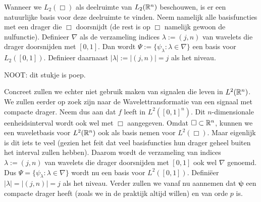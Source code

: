 Wanneer we $L_2(\Box)$ als deelruimte van $L_2(\mathbb{R}^n)$ beschouwen, is er een natuurlijke basis voor deze deelruimte te vinden. Neem namelijk alle basisfuncties met een drager die $\Box$ doorsnijdt (de rest is op $\Box$ namelijk gewoon de nulfunctie). Definieer $\nabla$ als de verzameling indices $\lambda := (j, n)$ van wavelets die drager doorsnijden met $[0,1]$. Dan wordt $\Psi := \{ \psi_\lambda: \lambda \in \nabla \}$ een basis voor $L_2([0,1])$. Definieer daarnaast $|\lambda| := |(j,n)| = j$ als het niveau.

NOOT: dit stukje is poep.


Concreet zullen we echter niet gebruik maken van signalen die leven in $L^2(\mathbb{R}^n)$. We zullen eerder op zoek zijn naar de Wavelettransformatie van een signaal met compacte drager. Neem dus aan dat $f$ leeft in $L^2([0,1]^n)$. Dit $n$-dimensionale eenheidsinterval wordt ook wel met $\Box$ aangegeven. Omdat $\Box \subset \mathbb{R}^n$, kunnen we een waveletbasis voor $L^2(\mathbb{R}^n)$ ook als basis nemen voor $L^2(\Box)$. Maar eigenlijk is dit iets te veel (gezien het feit dat veel basisfuncties hun drager geheel buiten het interval zullen hebben). Daarom wordt de verzameling van indices $\lambda := (j,n)$ van wavelets die drager doorsnijden met $[0,1]$ ook wel $\nabla$ genoemd. Dus $\Psi = \{ \psi_\lambda: \lambda \in \nabla \}$ wordt nu een basis voor $L^2([0,1])$. Defini\"eer $|\lambda| = |(j,n)| = j$ als het niveau.
Verder zullen we vanaf nu aannemen dat $\boldsymbol\psi$ een compacte drager heeft (zoals we in de praktijk altijd willen) en van orde $p$ is.
\fi

